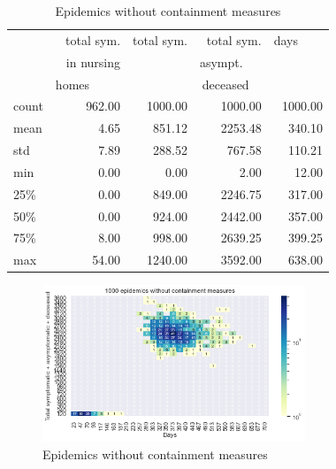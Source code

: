 \documentclass[11pt]{article}
\begin{document}
\begin{table}[H]
\center
\small
\begin{tabular}{lrrrr}
\toprule
{} & total sym.        &  total sym. & total sym.     & days~~~~ \\
{} & in nursing        &                  & asympt.~~~  & \\
{} & homes~~~~~  &                  & deceased~~ & \\
\midrule
count &     962.00 &             1000.00 &                 1000.00 & 1000.00 \\
mean  &       4.65 &              851.12 &                 2253.48 &  340.10 \\
std   &       7.89 &              288.52 &                  767.58 &  110.21 \\
min   &       0.00 &                0.00 &                    2.00 &   12.00 \\
25\%   &       0.00 &              849.00 &                 2246.75 &  317.00 \\
50\%   &       0.00 &              924.00 &                 2442.00 &  357.00 \\
75\%   &       8.00 &              998.00 &                 2639.25 &  399.25 \\
max   &      54.00 &             1240.00 &                 3592.00 &  638.00 \\
\bottomrule
\end{tabular}

\label{EpidemicsWithoutControlT}
\caption{Epidemics without containment measures}
\end{table}

\begin{figure}[H]
\begin{center}
\includegraphics[width=0.7\textwidth]{HM30_readRunResults1k_noControl_plusHMlog.png}
\caption{Epidemics without containment measures}
\label{EpidemicsWithoutControlHM}
\end{center}
\end{figure}
\end{document}
